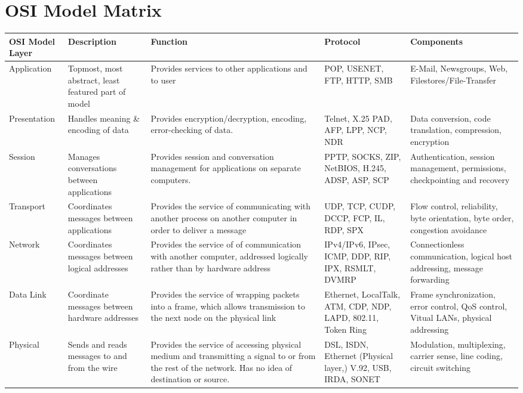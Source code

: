 \documentclass[11pt]{article}
\begin{document}
\section{OSI Model Matrix}
\begin{tabular}{| p{2cm} | p{3.5cm} | p{3.5cm} | p{2.5cm} | p{2.5cm} |}
\hline
OSI Model Layer & Description & Function & Protocol & Components \\
\hline
Application & Topmost, most abstract, least featured part of model & Provides services to other applications and to user & POP, USENET, FTP, HTTP, SMB & E-Mail, Newsgroups, Web, Filestores/File-Transfer \\
\hline
Presentation & Handles meaning \& encoding of data & Provides encryption/decryption, encoding, error-checking of data. & Telnet, X.25 PAD, AFP, LPP, NCP, NDR & Data conversion, code translation, compression, encryption \\
\hline
Session & Manages conversations between applications & Provides session and conversation management for applications on separate computers. & PPTP, SOCKS, ZIP, NetBIOS, H.245, ADSP, ASP, SCP & Authentication, session management, permissions, checkpointing and recovery \\
\hline
Transport & Coordinates messages between applications & Provides the service of communicating with another process on another computer in order to deliver a message & UDP, TCP, CUDP, DCCP, FCP, IL, RDP, SPX & Flow control, reliability, byte orientation, byte order, congestion avoidance \\
\hline
Network & Coordinates messages between logical addresses & Provides the service of of communication with another computer, addressed logically rather than by hardware address & IPv4/IPv6, IPsec, ICMP, DDP, RIP, IPX, RSMLT, DVMRP & Connectionless communication, logical host addressing, message forwarding \\
\hline
Data Link & Coordinate messages between hardware addresses & Provides the service of wrapping packets into a frame, which allows transmission to the next node on the physical link & Ethernet, LocalTalk, ATM, CDP, NDP, LAPD, 802.11, Token Ring & Frame synchronization, error control, QoS control, Vitual LANs, physical addressing \\
\hline 
Physical & Sends and reads messages to and from the wire & Provides the service of accessing physical medium and transmitting a signal to or from the rest of the network. Has no idea of destination or source. & DSL, ISDN, Ethernet (Physical layer,) V.92, USB, IRDA, SONET & Modulation, multiplexing, carrier sense, line coding, circuit switching \\
\hline

\end{tabular}
\end{document}
